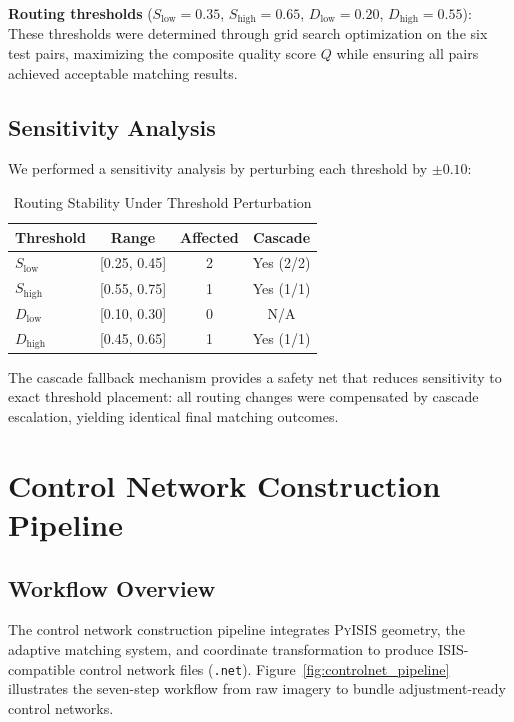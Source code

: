 \documentclass[lettersize,journal]{IEEEtran}
\newcommand{\pyisis}{\textsc{PyISIS}}
\begin{document}
\textbf{Routing thresholds} ($S_{\text{low}} = 0.35$, $S_{\text{high}} = 0.65$, $D_{\text{low}} = 0.20$, $D_{\text{high}} = 0.55$): These thresholds were determined through grid search optimization on the six test pairs, maximizing the composite quality score $Q$ while ensuring all pairs achieved acceptable matching results.

\subsection{Sensitivity Analysis}

We performed a sensitivity analysis by perturbing each threshold by $\pm 0.10$:

\begin{table}[htbp]
\caption{Routing Stability Under Threshold Perturbation}
\label{tab:sensitivity}
\centering
\begin{tabular}{@{}lccc@{}}
\toprule
\textbf{Threshold} & \textbf{Range} & \textbf{Affected} & \textbf{Cascade} \\
\midrule
$S_{\text{low}}$ & [0.25, 0.45] & 2 & Yes (2/2) \\
$S_{\text{high}}$ & [0.55, 0.75] & 1 & Yes (1/1) \\
$D_{\text{low}}$ & [0.10, 0.30] & 0 & N/A \\
$D_{\text{high}}$ & [0.45, 0.65] & 1 & Yes (1/1) \\
\bottomrule
\end{tabular}
\end{table}

The cascade fallback mechanism provides a safety net that reduces sensitivity to exact threshold placement: all routing changes were compensated by cascade escalation, yielding identical final matching outcomes.


\section{Control Network Construction Pipeline}\label{sec:controlnet}

\subsection{Workflow Overview}

The control network construction pipeline integrates \pyisis{} geometry, the adaptive matching system, and coordinate transformation to produce ISIS-compatible control network files (\texttt{.net}). Figure~\ref{fig:controlnet_pipeline} illustrates the seven-step workflow from raw imagery to bundle adjustment-ready control networks.
\end{document}
